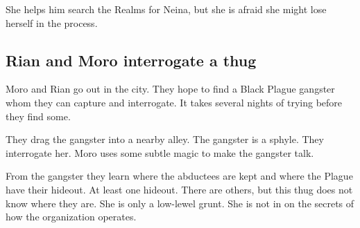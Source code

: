 She helps him search the Realms for Neina, but she is afraid she might lose herself in the process. 

  
  
  






\subsection{Rian and Moro interrogate a thug}
Moro and Rian go out in the city.
They hope to find a Black Plague gangster whom they can capture and interrogate.
It takes several nights of trying before they find some. 


They drag the gangster into a nearby alley. 
The gangster is a sphyle. 
They interrogate her. 
Moro uses some subtle magic to make the gangster talk. 

From the gangster they learn where the abductees are kept and where the Plague have their hideout.
At least one hideout. 
There are others, but this thug does not know where they are.
She is only a low-lewel grunt. 
She is not in on the secrets of how the organization operates. 

